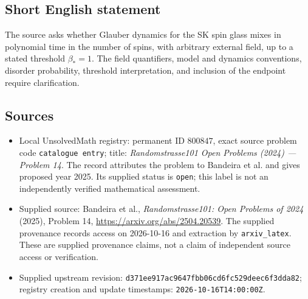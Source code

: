 \documentclass[11pt]{article}
\begin{document}
\subsection{Short English statement}
The source asks whether Glauber dynamics for the SK spin glass mixes in polynomial time in the number of spins, with arbitrary external field, up to a stated threshold \(\beta_\ast=1\). The field quantifiers, model and dynamics conventions, disorder probability, threshold interpretation, and inclusion of the endpoint require clarification.
\subsection{Sources}
\begin{itemize}
\item Local UnsolvedMath registry: permanent ID \(800847\), exact source problem code \texttt{catalogue entry}; title: \emph{Randomstrasse101 Open Problems (2024) --- Problem 14}. The record attributes the problem to Bandeira et al. and gives proposed year 2025. Its supplied status is \texttt{open}; this label is not an independently verified mathematical assessment.
\item Supplied source: Bandeira et al., \emph{Randomstrasse101: Open Problems of 2024} (2025), Problem 14, \url{https://arxiv.org/abs/2504.20539}. The supplied provenance records access on 2026-10-16 and extraction by \texttt{arxiv\_latex}. These are supplied provenance claims, not a claim of independent source access or verification.
\item Supplied upstream revision: \texttt{d371ee917ac9647fbb06cd6fc529deec6f3dda82}; registry creation and update timestamps: \texttt{2026-10-16T14:00:00Z}.
\end{itemize}
\end{document}
